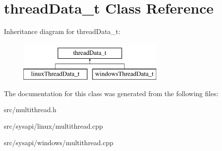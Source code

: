\hypertarget{classthreadData__t}{\section{thread\-Data\-\_\-t \-Class \-Reference}
\label{classthreadData__t}
}
\-Inheritance diagram for thread\-Data\-\_\-t\-:\begin{figure}[H]
\begin{center}
\leavevmode
\includegraphics[height=2.000000cm]{classthreadData__t}
\end{center}
\end{figure}


\-The documentation for this class was generated from the following files\-:\begin{DoxyCompactItemize}
\item 
src/multithread.\-h\item 
src/sysapi/linux/multithread.\-cpp\item 
src/sysapi/windows/multithread.\-cpp\end{DoxyCompactItemize}
